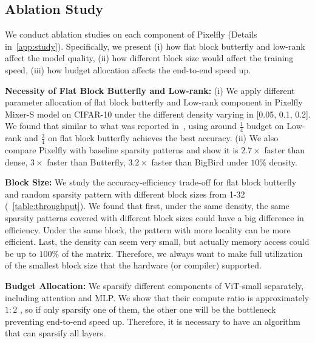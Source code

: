 \subsection{Ablation Study}
\label{exp:ablation}
We conduct ablation studies on each component of Pixelfly (Details in~\ref{app:study}). Specifically, we present (i) how flat block butterfly and low-rank affect the model quality, (ii) how different block size would affect the training speed, (iii) how budget allocation affects the end-to-end speed up.

\textbf{Necessity of Flat Block Butterfly and Low-rank:} (i) We apply different parameter allocation of flat block butterfly and Low-rank component in Pixelfly Mixer-S model on CIFAR-10 under the different density varying in [0.05, 0.1, 0.2]. We found that similar to what was reported in~\citep{scatterbrain}, using around $\frac{1}{4}$ budget on Low-rank and $\frac{3}{4}$ on flat block butterfly achieves the best accuracy. (ii) We also compare Pixelfly with baseline sparsity patterns and show it is $2.7\times$ faster than dense, $3\times$ faster than Butterfly, $3.2\times$ faster than BigBird under $10\%$ density.

\textbf{Block Size:} We study the accuracy-efficiency trade-off for flat block butterfly and random sparsity pattern with different block sizes from 1-32 (~\ref{table:throughput}). We found that first, under the same density, the same sparsity patterns covered with different block sizes could have a big difference in efficiency. Under the same block, the pattern with more locality can be more efficient. Last, the density can seem very small, but actually memory access could be up to $100\%$ of the matrix. Therefore, we always want to make full utilization of the smallest block size that the hardware (or compiler) supported.   

\textbf{Budget Allocation:} We sparsify different components of ViT-small separately, including attention and MLP. We show that their compute ratio is approximately $1:2$ , so if only sparsify one of them, the other one will be the bottleneck preventing end-to-end speed up. Therefore, it is necessary to have an algorithm that can sparsify all layers. 

